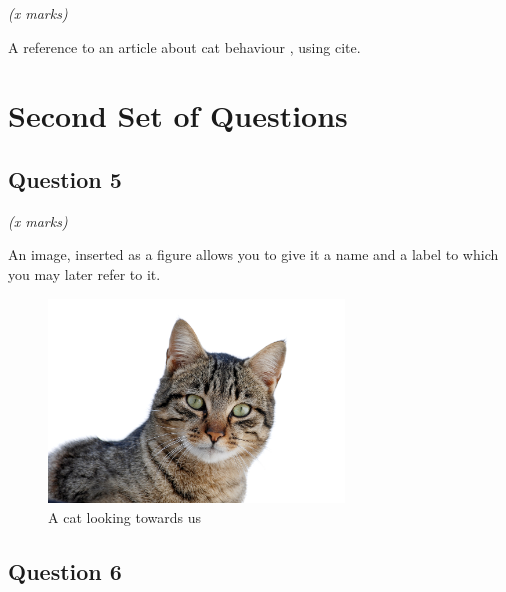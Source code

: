\documentclass[11pt,fleqn]{book} %
\begin{document}
\begin{flushright}
    \textit{(x marks)}
\end{flushright}

A reference to an article about cat behaviour \cite{gazzano2015}, using cite.




\chapter{Second Set of Questions}

\section{Question 5}

\begin{flushright}
    \textit{(x marks)}
\end{flushright}

An image, inserted as a figure allows you to give it a name and a label to which you may later refer to it.

\begin{figure}[h] %
    \centering
    \includegraphics[width=0.7\textwidth]{Pictures/CatPicture.jpg} %
    \caption{A cat looking towards us}
    \label{fig:catPicture}
\end{figure}

\newpage %

\section{Question 6}
\end{document}
